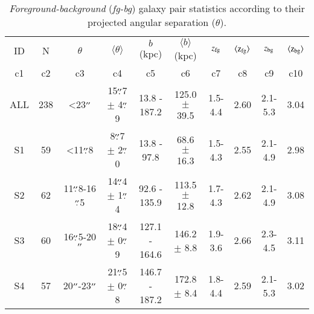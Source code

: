 \documentclass[longauth]{aa}
\begin{document}
\begin{table*}
\centering
\caption{\label{tbl:PairsStat}
\textit{Foreground-background} (\textit{fg-bg}) galaxy pair statistics 
according to their projected angular separation ($\theta$).}
\begin{tabular}{cccccccccc}
  \\
  \hline\hline
  \multicolumn{1}{c}{ID} &
  \multicolumn{1}{c}{N} &
  \multicolumn{1}{c}{$\theta$} & 
  \multicolumn{1}{c}{$\langle \theta \rangle$} &
  \multicolumn{1}{c}{$b$ (kpc)} & 
  \multicolumn{1}{c}{$\langle b \rangle$ (kpc)} & 
  \multicolumn{1}{c}{$z_{\rm{fg}}$} &
  \multicolumn{1}{c}{$\langle \rm{z}_{\rm{fg}}\rangle$} &
  \multicolumn{1}{c}{$z_{\rm{bg}}$}  & 
  \multicolumn{1}{c}{$\langle \rm{z}_{\rm{bg}}\rangle$} \\
  \multicolumn{1}{c}{c1} & 
  \multicolumn{1}{c}{c2} &
  \multicolumn{1}{c}{c3} &
  \multicolumn{1}{c}{c4} &
  \multicolumn{1}{c}{c5} &
  \multicolumn{1}{c}{c6} &
  \multicolumn{1}{c}{c7} &
  \multicolumn{1}{c}{c8} &
  \multicolumn{1}{c}{c9} &
  \multicolumn{1}{c}{c10} \\
  \hline\hline  
ALL & 238 &  <23$^{\prime\prime}$             & 15$\overset{\prime\prime}{.}$7 $\pm$ 4$\overset{\prime\prime}{.}$9 &  13.8 - 187.2 & 125.0 $\pm$ 39.5 & 1.5-4.4 & 2.60 & 2.1-5.3 & 3.04 \\
S1  &  59 &  <11$\overset{\prime\prime}{.}$8             &  8$\overset{\prime\prime}{.}$7 $\pm$ 2$\overset{\prime\prime}{.}$0 &  13.8 -  97.8 & 68.6  $\pm$ 16.3 & 1.5-4.3 & 2.55 & 2.1-4.9 & 2.98 \\
S2  &  62 &   11$\overset{\prime\prime}{.}$8-16$\overset{\prime\prime}{.}$5 & 14$\overset{\prime\prime}{.}$4 $\pm$ 1$\overset{\prime\prime}{.}$4 &  92.6 - 135.9 & 113.5 $\pm$ 12.8 & 1.7-4.3 & 2.62 & 2.1-4.9 & 3.08 \\
S3  &  60 &   16$\overset{\prime\prime}{.}$5-20$^{\prime\prime}$ & 18$\overset{\prime\prime}{.}$4 $\pm$ 0$\overset{\prime\prime}{.}$9 & 127.1 - 164.6 & 146.2 $\pm$  8.8 & 1.9-3.6 & 2.66 & 2.3-4.5 & 3.11 \\
S4  &  57 &   20$^{\prime\prime}$-23$^{\prime\prime}$ & 21$\overset{\prime\prime}{.}$5 $\pm$ 0$\overset{\prime\prime}{.}$8 & 146.7 - 187.2 & 172.8 $\pm$  8.4 & 1.8-4.4 & 2.59 & 2.1-5.3 & 3.02 \\
  \hline\hline
\end{tabular}
\end{table*}
\end{document}
